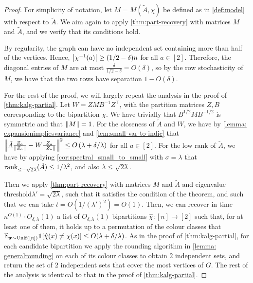 \begin{proof}
For simplicity of notation, let $M = M(\tilde{A}, \chi)$ be defined as in \cref{def:model} with respect to $\tilde{A}$.
We aim again to apply \cref{thm:part-recovery} with matrices $M$ and $\tilde{A}$, and we verify that its conditions hold.


By regularity, the graph can have no independent set containing more than half of the vertices. Hence, $\left\lvert\chi^{-1}(a)\right\rvert\geq (1/2-\delta)n$ for all $a \in [2]$. Therefore, the diagonal entries of $M$ are at most $\frac{\delta}{1/2-\delta}=O(\delta)$, so by the row stochasticity of $M$, we have that the two rows have separation $1-O(\delta)$.

For the rest of the proof, we will largely repeat the analysis in the proof of \cref{thm:kalg-partial}.
Let $W = Z M B^{-1} Z^\top$, with the partition matrices $Z, B$ corresponding to the bipartition $\chi$.
We have trivially that $B^{1/2} M B^{-1/2}$ is symmetric and that $\left\lVert M\right\rVert = 1$.
For the closeness of $\tilde{A}$ and $W$, we have by \cref{lemma: expansionimpliesvariance} and \cref{lem:small-var-to-indic} that $\left\lVert\tilde{A} \frac{Z_a}{\left\lVert Z_a\right\rVert} - W \frac{Z_a}{\left\lVert Z_a\right\rVert}\right\rVert^2 \leq O\left(\lambda + \delta/\lambda\right)$ for all $a \in [2]$.
For the low rank of $\tilde{A}$, we have by applying \cref{cor:spectral_small_to_small} with $\sigma=\lambda$ that $\operatorname{rank}_{\leq -\sqrt{2\lambda}}(\tilde{A}) \leq 1/\lambda^2$, and also $\lambda \leq \sqrt{2 \lambda}$. 

Then we apply \cref{thm:part-recovery} with matrices $M$ and $\tilde{A}$ and eigenvalue threshold\linebreak $\lambda' = \sqrt{2 \lambda}$, such that it satisfies the condition of the theorem, and such that we can take $t = O(1/(\lambda')^2) = O(1)$.
Then, we can recover in time $n^{O(1)} \cdot O_{\delta,\lambda}(1)$ a list of $O_{\delta,\lambda}(1)$ bipartitions $\hat{\chi}: [n] \to [2]$ such that, for at least one of them, it holds up to a permutation of the colour classes that $\mathbb{E}_{\bm{x} \sim \operatorname{Unif}([n])} \mathbf{1}[\hat\chi(x) \neq \chi(x)] \leq O(\lambda+\delta/\lambda)$.
As in the proof of \cref{thm:kalg-partial}, for each candidate bipartition we apply the rounding algorithm in \cref{lemma: generalrounding} on each of its colour classes to obtain $2$ independent sets, and return the set of $2$ independent sets that cover the most vertices of $G$.
The rest of the analysis is identical to that in the proof of \cref{thm:kalg-partial}.
\end{proof}

